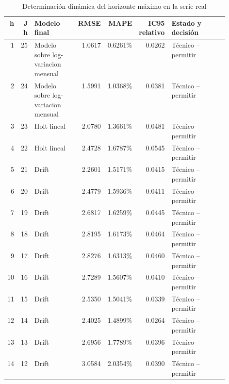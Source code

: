 \begin{landscape}
\begin{table}[H]
\centering
\caption{Determinación dinámica del horizonte máximo en la serie real}
\label{tab:ejemplo_horizonte_maximo_vias_urbanas}
\tiny
\begin{adjustbox}{max width=\linewidth}
\begin{tabular}{rrp{0.22\linewidth}rrrp{0.31\linewidth}}
\toprule
h & J h & Modelo final & RMSE & MAPE & IC95 relativo & Estado y decisión \\
\midrule
1 & 25 & Modelo sobre log-variacion mensual & 1.0617 & 0.6261\% & 0.0262 & Técnico -- permitir \\
2 & 24 & Modelo sobre log-variacion mensual & 1.5991 & 1.0368\% & 0.0381 & Técnico -- permitir \\
3 & 23 & Holt lineal & 2.0780 & 1.3661\% & 0.0481 & Técnico -- permitir \\
4 & 22 & Holt lineal & 2.4728 & 1.6787\% & 0.0545 & Técnico -- permitir \\
5 & 21 & Drift & 2.2601 & 1.5171\% & 0.0415 & Técnico -- permitir \\
6 & 20 & Drift & 2.4779 & 1.5936\% & 0.0411 & Técnico -- permitir \\
7 & 19 & Drift & 2.6817 & 1.6259\% & 0.0445 & Técnico -- permitir \\
8 & 18 & Drift & 2.8195 & 1.6173\% & 0.0464 & Técnico -- permitir \\
9 & 17 & Drift & 2.8276 & 1.6313\% & 0.0460 & Técnico -- permitir \\
10 & 16 & Drift & 2.7289 & 1.5607\% & 0.0410 & Técnico -- permitir \\
11 & 15 & Drift & 2.5350 & 1.5041\% & 0.0339 & Técnico -- permitir \\
12 & 14 & Drift & 2.4025 & 1.4899\% & 0.0264 & Técnico -- permitir \\
13 & 13 & Drift & 2.6956 & 1.7789\% & 0.0396 & Técnico -- permitir \\
14 & 12 & Drift & 3.0584 & 2.0354\% & 0.0390 & Técnico -- permitir \\

\end{tabular}
\end{adjustbox}
\end{table}
\end{landscape}
